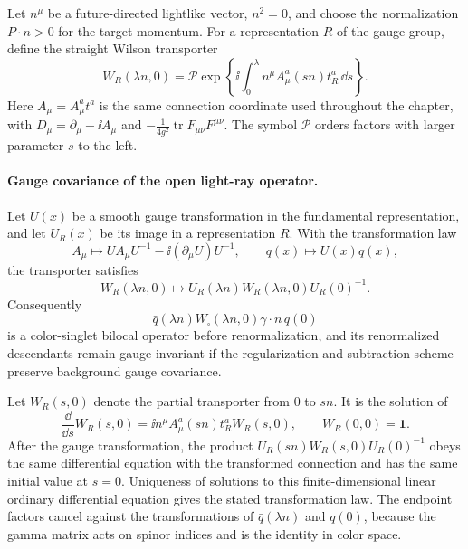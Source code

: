 Let \(n^\mu\) be a future-directed lightlike vector, \(n^2=0\), and choose the
normalization \(P\cdot n>0\) for the target momentum.  For a representation
\(R\) of the gauge group, define the straight Wilson transporter
\[
  W_R(\lambda n,0)
  =
  \mathcal P
  \exp\left\{\ii\int_0^\lambda
  n^\mu A_\mu^a(sn)t_R^a\,\dd s\right\}.
\]
Here \(A_\mu=A_\mu^at^a\) is the same connection coordinate used throughout the
chapter, with \(D_\mu=\partial_\mu-\ii A_\mu\) and
\(-\frac1{4g^2}\operatorname{tr}F_{\mu\nu}F^{\mu\nu}\).  The symbol
\(\mathcal P\) orders factors with larger parameter \(s\) to the left.

\paragraph{Gauge covariance of the open light-ray operator.}
Let \(U(x)\) be a smooth gauge transformation in the fundamental
representation, and let \(U_R(x)\) be its image in a representation \(R\).
With the transformation law
\[
  A_\mu\longmapsto U A_\mu U^{-1}-\ii(\partial_\mu U)U^{-1},
  \qquad
  q(x)\longmapsto U(x)q(x),
\]
the transporter satisfies
\begin{equation}
  W_R(\lambda n,0)
  \longmapsto
  U_R(\lambda n)W_R(\lambda n,0)U_R(0)^{-1}.
  \label{eq:qcd-wilson-transporter-gauge-transformation}
\end{equation}
Consequently
\[
  \bar q(\lambda n)W_{\square}(\lambda n,0)\gamma\cdot n\,q(0)
\]
is a color-singlet bilocal operator before renormalization, and its
renormalized descendants remain gauge invariant if the regularization and
subtraction scheme preserve background gauge covariance.

Let \(W_R(s,0)\) denote the partial transporter from \(0\) to \(sn\).  It is the
solution of
\[
  \frac{\dd}{\dd s}W_R(s,0)
  =
  \ii n^\mu A_\mu^a(sn)t_R^a W_R(s,0),
  \qquad
  W_R(0,0)=\mathbf 1 .
\]
After the gauge transformation, the product
\(U_R(sn)W_R(s,0)U_R(0)^{-1}\) obeys the same differential equation with the
transformed connection and has the same initial value at \(s=0\).  Uniqueness of
solutions to this finite-dimensional linear ordinary differential equation
gives the stated transformation law.  The endpoint factors cancel against the
transformations of \(\bar q(\lambda n)\) and \(q(0)\), because the gamma matrix
acts on spinor indices and is the identity in color space.

